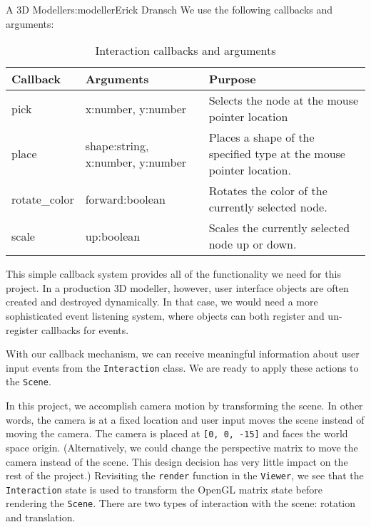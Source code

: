 \begin{aosachapter}{A 3D Modeller}{s:modeller}{Erick Dransch}
We use the following callbacks and arguments:

\begin{table}
\centering
{\footnotesize
{}
\begin{tabular}{lll}
\hline
\textbf{Callback}
& \textbf{Arguments}
& \textbf{Purpose}
\\
\hline
pick    
& x:number, y:number 
& Selects the node at the mouse pointer location
\\
place & 
shape:string, x:number, y:number & 
Places a shape of the specified type at the mouse pointer location.
\\
rotate\_color & 
forward:boolean & 
Rotates the color of the currently selected node.
\\
scale & 
up:boolean & 
Scales the currently selected node up or down.
\\
\hline
\end{tabular}
}
\caption{Interaction callbacks and arguments}
\label{500l.tbl.callbacks}
\end{table}

This simple callback system provides all of the functionality we need
for this project. In a production 3D modeller, however, user interface
objects are often created and destroyed dynamically. In that case, we
would need a more sophisticated event listening system, where objects
can both register and un-register callbacks for events.

\label{interfacing-with-the-scene}

With our callback mechanism, we can receive meaningful information about
user input events from the \texttt{Interaction} class. We are ready to
apply these actions to the \texttt{Scene}.

\label{moving-the-scene}

In this project, we accomplish camera motion by transforming the scene.
In other words, the camera is at a fixed location and user input moves
the scene instead of moving the camera. The camera is placed at
\texttt{{[}0, 0, -15{]}} and faces the world space origin.
(Alternatively, we could change the perspective matrix to move the
camera instead of the scene. This design decision has very little impact
on the rest of the project.) Revisiting the \texttt{render} function in
the \texttt{Viewer}, we see that the \texttt{Interaction} state is used
to transform the OpenGL matrix state before rendering the
\texttt{Scene}. There are two types of interaction with the scene:
rotation and translation.


\end{aosachapter}
